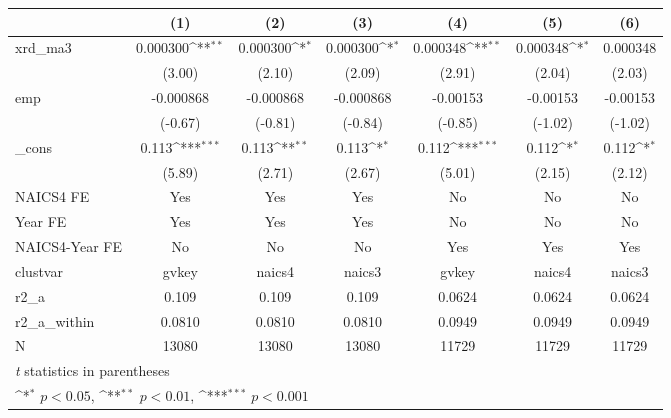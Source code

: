 {
\def\sym#1{\ifmmode^{#1}\else\(^{#1}\)\fi}
\begin{tabular}{l*{6}{c}}
\hline\hline
            &\multicolumn{1}{c}{(1)}         &\multicolumn{1}{c}{(2)}         &\multicolumn{1}{c}{(3)}         &\multicolumn{1}{c}{(4)}         &\multicolumn{1}{c}{(5)}         &\multicolumn{1}{c}{(6)}         \\
\hline
xrd\_ma3     &    0.000300\sym{**} &    0.000300\sym{*}  &    0.000300\sym{*}  &    0.000348\sym{**} &    0.000348\sym{*}  &    0.000348         \\
            &      (3.00)         &      (2.10)         &      (2.09)         &      (2.91)         &      (2.04)         &      (2.03)         \\
[1em]
emp         &   -0.000868         &   -0.000868         &   -0.000868         &    -0.00153         &    -0.00153         &    -0.00153         \\
            &     (-0.67)         &     (-0.81)         &     (-0.84)         &     (-0.85)         &     (-1.02)         &     (-1.02)         \\
[1em]
\_cons      &       0.113\sym{***}&       0.113\sym{**} &       0.113\sym{*}  &       0.112\sym{***}&       0.112\sym{*}  &       0.112\sym{*}  \\
            &      (5.89)         &      (2.71)         &      (2.67)         &      (5.01)         &      (2.15)         &      (2.12)         \\
[1em]
NAICS4 FE   &         Yes         &         Yes         &         Yes         &          No         &          No         &          No         \\
[1em]
Year FE     &         Yes         &         Yes         &         Yes         &          No         &          No         &          No         \\
[1em]
NAICS4-Year FE&          No         &          No         &          No         &         Yes         &         Yes         &         Yes         \\
\hline
clustvar    &       gvkey         &      naics4         &      naics3         &       gvkey         &      naics4         &      naics3         \\
r2\_a        &       0.109         &       0.109         &       0.109         &      0.0624         &      0.0624         &      0.0624         \\
r2\_a\_within &      0.0810         &      0.0810         &      0.0810         &      0.0949         &      0.0949         &      0.0949         \\
N           &       13080         &       13080         &       13080         &       11729         &       11729         &       11729         \\
\hline\hline
\multicolumn{7}{l}{\footnotesize \textit{t} statistics in parentheses}\\
\multicolumn{7}{l}{\footnotesize \sym{*} \(p<0.05\), \sym{**} \(p<0.01\), \sym{***} \(p<0.001\)}\\
\end{tabular}
}
